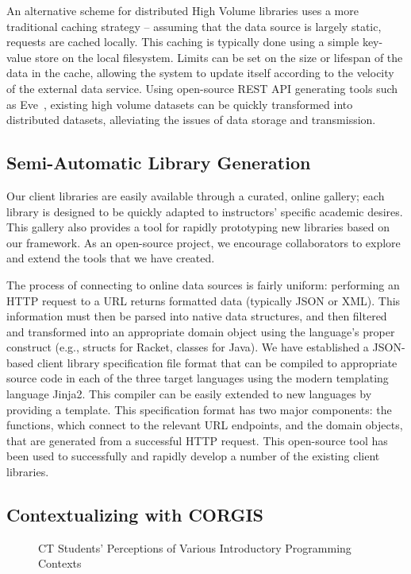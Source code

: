 An alternative scheme for distributed High Volume libraries uses a more traditional caching strategy -- assuming that the data source is largely static, requests are cached locally.
This caching is typically done using a simple key-value store on the local filesystem.
Limits can be set on the size or lifespan of the data in the cache, allowing the system to update itself according to the velocity of the external data service.
Using open-source REST API generating tools such as Eve~\cite{Eve}, existing high volume datasets can be quickly transformed into distributed datasets, alleviating the issues of data storage and transmission.

\subsection{Semi-Automatic Library Generation}

Our client libraries are easily available through a curated, online gallery; each library is designed to be quickly adapted to instructors' specific academic desires. 
This gallery also provides a tool for rapidly prototyping new libraries based on our framework.
As an open-source project, we encourage collaborators to explore and extend the tools that we have created.

The process of connecting to online data sources is fairly uniform: performing an HTTP request to a URL returns formatted data (typically JSON or XML). 
This information must then be parsed into native data structures, and then filtered and transformed into an appropriate domain object using the language's proper construct (e.g., structs for Racket, classes for Java).
We have established a JSON-based client library specification file format that can be compiled to appropriate source code in each of the three target languages using the modern templating language Jinja2. 
This compiler can be easily extended to new languages by providing a template.
This specification format has two major components: the functions, which connect to the relevant URL endpoints, and the domain objects, that are generated from a successful HTTP request. 
This open-source tool has been used to successfully and rapidly develop a number of the existing client libraries.

\subsection{Contextualizing with CORGIS}

\begin{figure}
		\begin{center}
		\end{center}
		\caption{CT Students' Perceptions of Various Introductory Programming Contexts}
		\label{fig-contexts-compared}
\end{figure}

